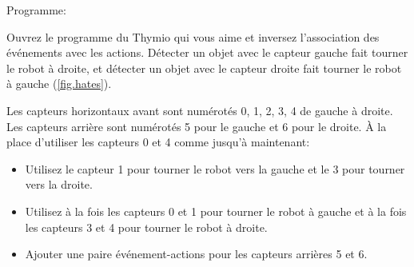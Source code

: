 {\raggedleft \hfill Programme: }

Ouvrez le programme du Thymio qui vous aime et inversez l'association des événements avec les actions.
Détecter un objet avec le capteur gauche fait tourner le robot à droite, et détecter un objet avec le capteur droite fait tourner le robot à gauche (\cref{fig.hates}).


{
Les capteurs horizontaux avant sont numérotés 0, 1, 2, 3, 4 de gauche à droite.
Les capteurs arrière sont numérotés 5 pour le gauche et 6 pour le droite.
À la place d'utiliser les capteurs 0 et 4 comme jusqu'à maintenant:
\begin{itemize}[noitemsep,nosep,leftmargin=*]
\item Utilisez le capteur 1 pour tourner le robot vers la gauche et le 3 pour tourner vers la droite.
\item Utilisez à la fois les capteurs 0 et 1 pour tourner le robot à gauche et à la fois les capteurs 3 et 4 pour tourner le robot à droite.
\item Ajouter une paire événement-actions pour les capteurs arrières 5 et 6.
\end{itemize}
}

\bigskip


\bigskip

